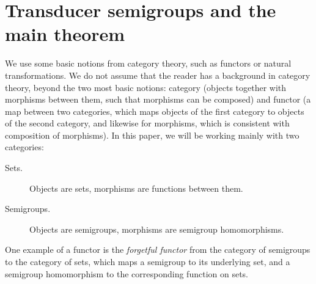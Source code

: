 \section{Transducer semigroups and the main theorem}
We use some basic notions from category theory, such as functors or natural transformations. 
We do not assume that the reader has a background in category theory, beyond the two most basic notions: category (objects together with morphisms between them, such that morphisms can be composed) and functor (a map between two categories, which maps objects of the first category to objects of the second category, and likewise for morphisms, which is consistent with composition of morphisms). In this paper, we will be working mainly with two categories: 
\begin{description}
    \item[Sets.] Objects are sets,  morphisms are functions between them.
    \item[Semigroups.] Objects are semigroups,  morphisms are semigroup homomorphisms.
\end{description}

One example of a functor is the \emph{forgetful functor} from the category of semigroups to the category of sets, which maps a semigroup to its underlying set, and a semigroup homomorphism to the corresponding function on sets. 

